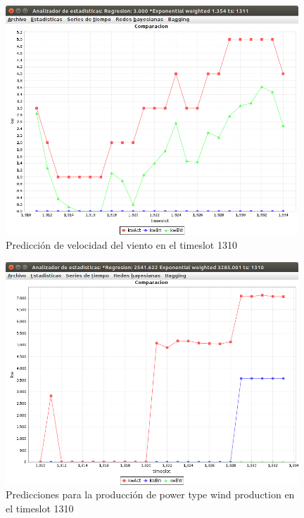 \begin{figure}[h]
	\centering
	\includegraphics[width=11cm]{img/prediccionViento1310.png}
	\caption{Predicción de velocidad del viento en el timeslot 1310}
	\label{fig:prediccionViento1310}
\end{figure}

\begin{figure}[h]
	\centering
	\includegraphics[width=11cm]{img/produccionViento1310.png}
	\caption{Predicciones para la producción de power type wind production en el timeslot 1310}
	\label{fig:produccionViento1310}
\end{figure}



